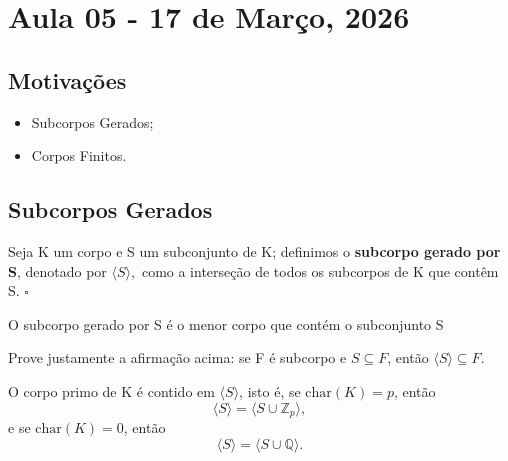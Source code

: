 \documentclass[../algebraIII_notes.tex]{subfiles}
\begin{document}
\section{Aula 05 - 17 de Março, 2026}
\subsection{Motivações}
\begin{itemize}
	\item Subcorpos Gerados;
	\item Corpos Finitos.
\end{itemize}
\subsection{Subcorpos Gerados}
\begin{def*}
	Seja K um corpo e S um subconjunto de K; definimos o \textbf{subcorpo gerado por S}, denotado por \(\langle S \rangle,\) como a interseção de todos os subcorpos de K que contêm S. \(\square\)
\end{def*}
O subcorpo gerado por S é o menor corpo que contém o subconjunto S
\begin{exr}
	Prove justamente a afirmação acima: se F é subcorpo e \(S\subseteq F\), então \(\langle S \rangle\subseteq F\).
\end{exr}
\begin{tcolorbox}[
		skin=enhanced,
		title=Observação,
		fonttitle=\bfseries,
		colframe=black,
		colbacktitle=cyan!75!white,
		colback=cyan!15,
		colbacklower=black,
		coltitle=black,
		drop fuzzy shadow,
	]
	O corpo primo de K é contido em \(\langle S \rangle\), isto é, se \(\mathrm{char}(K)=p\), então
	\[
		\langle S \rangle = \langle S \cup \mathbb{Z}_{p} \rangle,
	\]
	e se \(\mathrm{char}(K)=0\), então
	\[
		\langle S \rangle=\langle S\cup \mathbb{Q} \rangle.
	\]
\end{tcolorbox}
\end{document}
